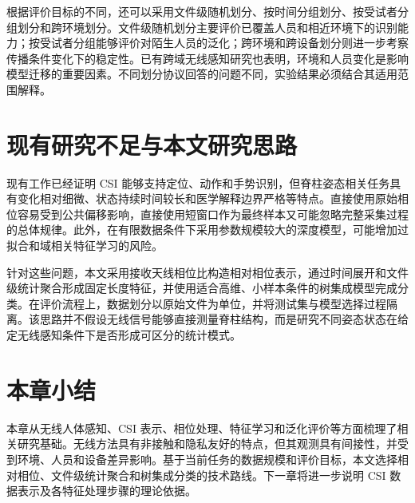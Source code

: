 根据评价目标的不同，还可以采用文件级随机划分、按时间分组划分、按受试者分组划分和跨环境划分。文件级随机划分主要评价已覆盖人员和相近环境下的识别能力；按受试者分组能够评价对陌生人员的泛化；跨环境和跨设备划分则进一步考察传播条件变化下的稳定性。已有跨域无线感知研究也表明，环境和人员变化是影响模型迁移的重要因素\cite{crosssense2018,widar2019}。不同划分协议回答的问题不同，实验结果必须结合其适用范围解释。

\section{现有研究不足与本文研究思路}
现有工作已经证明 CSI 能够支持定位、动作和手势识别，但脊柱姿态相关任务具有变化相对细微、状态持续时间较长和医学解释边界严格等特点。直接使用原始相位容易受到公共偏移影响，直接使用短窗口作为最终样本又可能忽略完整采集过程的总体规律。此外，在有限数据条件下采用参数规模较大的深度模型，可能增加过拟合和域相关特征学习的风险。

针对这些问题，本文采用接收天线相位比构造相对相位表示，通过时间展开和文件级统计聚合形成固定长度特征，并使用适合高维、小样本条件的树集成模型完成分类。在评价流程上，数据划分以原始文件为单位，并将测试集与模型选择过程隔离。该思路并不假设无线信号能够直接测量脊柱结构，而是研究不同姿态状态在给定无线感知条件下是否形成可区分的统计模式。

\section{本章小结}
本章从无线人体感知、CSI 表示、相位处理、特征学习和泛化评价等方面梳理了相关研究基础。无线方法具有非接触和隐私友好的特点，但其观测具有间接性，并受到环境、人员和设备差异影响。基于当前任务的数据规模和评价目标，本文选择相对相位、文件级统计聚合和树集成分类的技术路线。下一章将进一步说明 CSI 数据表示及各特征处理步骤的理论依据。
